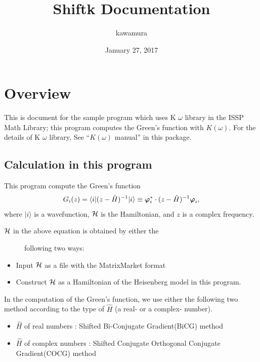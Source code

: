 \documentclass[letterpaper,10pt,dvipdfmx,openany]{sphinxmanual}
\title{Shiftk Documentation}
\date{January 27, 2017}
\author{kawamura}
\begin{document}
\maketitle
\tableofcontents
{}\label{index::doc}



\chapter{Overview}
\label{shiftk_overview_en:overview}\label{shiftk_overview_en:welcome-to-sample-program-s-documentation}\label{shiftk_overview_en::doc}
This is document for the sample program which uses
K \(\omega\) library in the ISSP Math Library;
this program computes the Green's function with \(K(\omega)\).
For the details of K \(\omega\) library, See
``\(K(\omega)\) manual'' in this package.


\section{Calculation in this program}
\label{shiftk_overview_en:calculation-in-this-program}
This program compute the Green's function
\begin{gather}
\begin{split}\begin{align}
G_{i}(z) =
\langle i | (z-{\hat H})^{-1}| i \rangle
\equiv
{\boldsymbol \varphi}_i^{*} \cdot (z-{\hat H})^{-1} {\boldsymbol \varphi}_i,
\end{align}\end{split}\notag
\end{gather}
where \(| i \rangle\) is a wavefunction,
\({\cal H}\) is the Hamiltonian, and
\(z\) is a complex frequency.
\begin{description}
\item[{\({\cal H}\) in the above equation is obtained by either the}] \leavevmode
following two ways:

\end{description}
\begin{itemize}
\item {} 
Input \({\cal H}\) as a file with the MatrixMarket format

\item {} 
Construct \({\cal H}\) as a Hamiltonian of the
Heisenberg model in this program.

\end{itemize}

In the computation of the Green's function,
we use either the following two method according to the type
of \({\hat H}\) (a real- or a complex- number).
\begin{itemize}
\item {} 
\({\hat H}\) of real numbers : Shifted Bi-Conjugate Gradient(BiCG) method

\item {} 
\({\hat H}\) of complex numbers : Shifted Conjugate Orthogonal Conjugate Gradient(COCG) method

\end{itemize}
\end{document}
